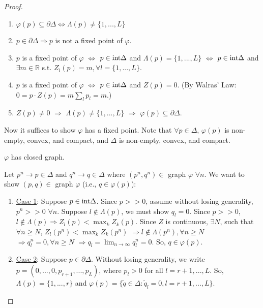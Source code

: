 \documentclass[11pt]{elegantbook}
\begin{document}
\begin{proof}
    \begin{note}
        \begin{enumerate}
            \item $\varphi(p)\subseteq \partial \Delta \Leftrightarrow \Lambda(p)\neq\{1,...,L\}$
            \item $p\in\partial \Delta \Rightarrow p$ is not a fixed point of $\varphi$.
            \item $p$ is a fixed point of $\varphi$ $\Leftrightarrow$ $p\in \textnormal{int}\Delta$ and $\Lambda(p)=\{1,...,L\}$ $\Leftrightarrow$ $p\in \textnormal{int}\Delta$ and $\exists m\in \mathbb{R}$ s.t. $Z_l(p)=m, \forall l=\{1,...,L\}$.
            \item $p$ is a fixed point of $\varphi$ $\Leftrightarrow$ $p\in \textnormal{int}\Delta$ and $Z(p)=0$. (By Walras' Law: $0=p\cdot Z(p)=m \sum_{l}p_l=m$.)
            \item $Z(p)\neq 0$ $\Rightarrow$ $\Lambda(p)\neq\{1,...,L\}$ $\Rightarrow$ $\varphi(p)\subseteq \partial \Delta$.
        \end{enumerate}
    \end{note}
    Now it suffices to show $\varphi$ has a fixed point. Note that $\forall p\in \Delta$, $\varphi(p)$ is non-empty, convex, and compact, and $\Delta$ is non-empty, convex, and compact.
    \begin{claim}
        $\varphi$ has closed graph.
    \end{claim}
    Let $p^n \rightarrow p\in\Delta$ and $q^n \rightarrow q\in\Delta$ where $(p^n,q^n)\in$ graph $\varphi$ $\forall n$. We want to show $(p,q)\in$ graph $\varphi$ (i.e., $q\in \varphi(p)$):
    \begin{enumerate}[$\circ$]
        \item \underline{Case 1}: Suppose $p\in \textnormal{int}\Delta$. Since $p>>0$, assume without losing generality, $p^n>>0$ $\forall n$. Suppose $l\notin \Lambda(p)$, we must show $q_l=0$. Since $p>>0$, $l\notin \Lambda(p) \Rightarrow Z_l(p)<\max_{k}Z_k(p)$. Since $Z$ is continuous, $\exists N$, such that $\forall n\geq N$, $Z_l(p^n)<\max_k Z_k(p^n)$ $\Rightarrow l\notin \Lambda(p^n), \forall n\geq N$ $\Rightarrow q^n_l=0, \forall n\geq N$ $\Rightarrow q_l=\lim_{n \rightarrow \infty}q^n_l=0$. So, $q\in \varphi(p)$.
        \item \underline{Case 2}: Suppose $p\in \partial\Delta$. Without losing generality, we write $p=(0,...,0,p_{r+1},...,p_L)$, where $p_l>0$ for all $l=r+1,...,L$. So, $\Lambda(p)=\{1,...,r\}$ and $\varphi(p)=\{\tilde{q}\in\Delta:\tilde{q}_l=0,l=r+1,...,L\}$.

\end{enumerate}
\end{proof}
\end{document}

